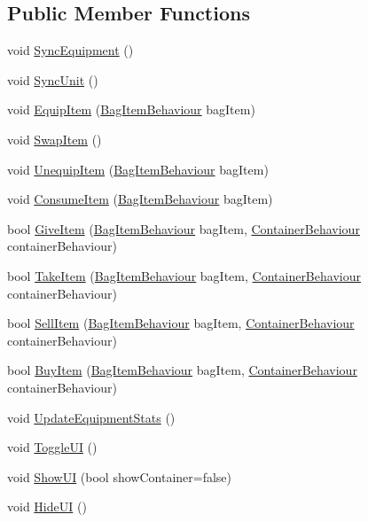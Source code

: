 \subsection*{Public Member Functions}
\begin{DoxyCompactItemize}
\item 
void \mbox{\hyperlink{class_bag_behaviour_ab7a8add6e04a204513a05f0d312df676}{Sync\+Equipment}} ()
\item 
void \mbox{\hyperlink{class_bag_behaviour_a1ab1c5f24022bf503ad3d3a18387515f}{Sync\+Unit}} ()
\item 
void \mbox{\hyperlink{class_bag_behaviour_a472cbdd4764a3f7980c19d83b3789651}{Equip\+Item}} (\mbox{\hyperlink{class_bag_item_behaviour}{Bag\+Item\+Behaviour}} bag\+Item)
\item 
void \mbox{\hyperlink{class_bag_behaviour_addf36803ab1e8f36c33054666a9b7618}{Swap\+Item}} ()
\item 
void \mbox{\hyperlink{class_bag_behaviour_a61062b91187139c43e2681c220111433}{Unequip\+Item}} (\mbox{\hyperlink{class_bag_item_behaviour}{Bag\+Item\+Behaviour}} bag\+Item)
\item 
void \mbox{\hyperlink{class_bag_behaviour_a407231bcd34e96129c9ae624a484a045}{Consume\+Item}} (\mbox{\hyperlink{class_bag_item_behaviour}{Bag\+Item\+Behaviour}} bag\+Item)
\item 
bool \mbox{\hyperlink{class_bag_behaviour_ac72b22f2f0340663e461c4a10f33281d}{Give\+Item}} (\mbox{\hyperlink{class_bag_item_behaviour}{Bag\+Item\+Behaviour}} bag\+Item, \mbox{\hyperlink{class_container_behaviour}{Container\+Behaviour}} container\+Behaviour)
\item 
bool \mbox{\hyperlink{class_bag_behaviour_a0cde4989737c537ca94730cc690d6780}{Take\+Item}} (\mbox{\hyperlink{class_bag_item_behaviour}{Bag\+Item\+Behaviour}} bag\+Item, \mbox{\hyperlink{class_container_behaviour}{Container\+Behaviour}} container\+Behaviour)
\item 
bool \mbox{\hyperlink{class_bag_behaviour_aa0aed3d648b13c1add4c2e2ce2ac9c38}{Sell\+Item}} (\mbox{\hyperlink{class_bag_item_behaviour}{Bag\+Item\+Behaviour}} bag\+Item, \mbox{\hyperlink{class_container_behaviour}{Container\+Behaviour}} container\+Behaviour)
\item 
bool \mbox{\hyperlink{class_bag_behaviour_a22439e4f35b9173c64d16c2534c4b388}{Buy\+Item}} (\mbox{\hyperlink{class_bag_item_behaviour}{Bag\+Item\+Behaviour}} bag\+Item, \mbox{\hyperlink{class_container_behaviour}{Container\+Behaviour}} container\+Behaviour)
\item 
void \mbox{\hyperlink{class_bag_behaviour_ad2e50a51bbb8f9c90a3241dbce0f87c0}{Update\+Equipment\+Stats}} ()
\item 
void \mbox{\hyperlink{class_bag_behaviour_a830725c05ecdc1a1a637d26cf5cff0dc}{Toggle\+UI}} ()
\item 
void \mbox{\hyperlink{class_bag_behaviour_aed83310e460fbfb0fa033cfd9fa41ba5}{Show\+UI}} (bool show\+Container=false)
\item 
void \mbox{\hyperlink{class_bag_behaviour_a731b060bd01b971246839664dfd86530}{Hide\+UI}} ()
\end{DoxyCompactItemize}
